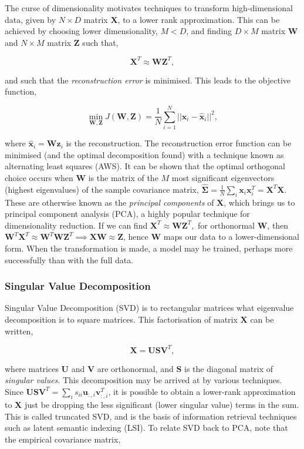\documentclass[11pt]{amsart}
\begin{document}
The curse of dimensionality motivates techniques to transform high-dimensional data, given by $N \times D$ matrix $\mathbf{X}$, to a lower rank approximation. This can be achieved by choosing lower dimensionality, $M  < D$, and finding $D \times M$ matrix $\mathbf{W}$ and $N \times M$ matrix $\mathbf{Z}$ such that,

$$\mathbf{X}^T \approx \mathbf{W}\mathbf{Z}^T,$$

and such that the \emph{reconstruction error} is minimised. This leads to the objective function,

$$\min_{\mathbf{W}, \mathbf{Z}} J(\mathbf{W}, \mathbf{Z}) = \frac{1}{N}\sum_{i=1}^N||\mathbf{x}_i - \hat{\mathbf{x}}_i||^2,$$

where $\hat{\mathbf{x}}_i = \mathbf{W}\mathbf{z}_i$ is the reconstruction. The reconstruction error function can be minimised (and the optimal decomposition found) with a technique known as alternating least squares (AWS). It can be shown that the optimal orthogonal choice occurs when $\mathbf{W}$ is the matrix of the $M$ most significant eigenvectors (highest eigenvalues) of the sample covariance matrix, $\hat{\boldsymbol\Sigma} = \frac{1}{N}\sum_i\mathbf{x}_i\mathbf{x}_i^T = \mathbf{X}^T\mathbf{X}$. These are otherwise known as the \emph{principal components} of $\mathbf{X}$, which brings us to principal component analysis (PCA), a highly popular technique for dimensionality reduction. If we can find $\mathbf{X}^T \approx \mathbf{W}\mathbf{Z}^T,$ for orthonormal $\mathbf{W}$, then $\mathbf{W}^T\mathbf{X}^T \approx \mathbf{W}^T\mathbf{W}\mathbf{Z}^T \implies \mathbf{X}\mathbf{W}  \approx \mathbf{Z}$, hence $\mathbf{W}$ maps our data to a lower-dimensional form. When the transformation is made, a model may be trained, perhaps more successfully than with the full data.

\subsubsection{Singular Value Decomposition}

Singular Value Decomposition (SVD) is to rectangular matrices what eigenvalue decomposition is to square matrices. This factorisation of matrix $\mathbf{X}$ can be written,

$$\mathbf{X} = \mathbf{U}\mathbf{S}\mathbf{V}^T,$$

where matrices $\mathbf{U}$ and $\mathbf{V}$ are orthonormal, and $\mathbf{S}$ is the diagonal matrix of \emph{singular values}. This decomposition may be arrived at by various techniques. Since $\mathbf{U}\mathbf{S}\mathbf{V}^T = \sum_i s_{ii} \mathbf{u}_{:,i}\mathbf{v}_{:,i}^T$, it is possible to obtain a lower-rank approximation to $\mathbf{X}$ just be dropping the less significant (lower singular value) terms in the sum. This is called truncated SVD, and is the basis of information retrieval techniques such as latent semantic indexing (LSI). To relate SVD back to PCA, note that the empirical covariance matrix,
\end{document}
